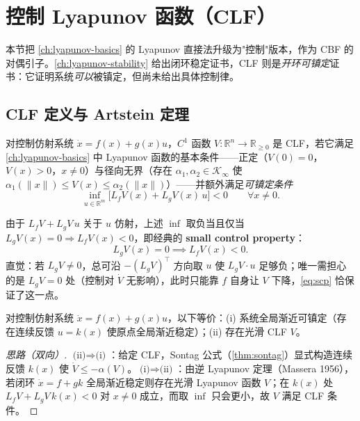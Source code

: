 \section{控制 Lyapunov 函数（CLF）}
\label{sec:cbf-clf}

本节把 \cref{ch:lyapunov-basics} 的 Lyapunov 直接法升级为"控制"版本，作为 CBF 的对偶引子。\cref{ch:lyapunov-stability} 给出闭环稳定证书，CLF 则是\emph{开环可镇定}证书：它证明系统\emph{可以}被镇定，但尚未给出具体控制律。

\subsection{CLF 定义与 Artstein 定理}

\begin{definition}[控制 Lyapunov 函数]\label{def:clf}
对控制仿射系统 $\dot x=f(x)+g(x)u$，$C^1$ 函数 $V:\mathbb R^n\to\mathbb R_{\ge0}$ 是 CLF，若它满足 \cref{ch:lyapunov-basics} 中 Lyapunov 函数的基本条件——正定（$V(0)=0$，$V(x)>0$，$x\neq0$）与径向无界（存在 $\alpha_1,\alpha_2\in\mathcal K_\infty$ 使 $\alpha_1(\|x\|)\le V(x)\le\alpha_2(\|x\|)$）——并额外满足\emph{可镇定条件}
\begin{equation}
\inf_{u\in\mathbb R^m}\big[L_fV(x)+L_gV(x)\,u\big]<0\qquad\forall x\neq0.
\label{eq:clf-cond}
\end{equation}
\end{definition}

由于 $L_fV+L_gV\,u$ 关于 $u$ 仿射，上述 $\inf$ 取负当且仅当 $L_gV(x)=0\Rightarrow L_fV(x)<0$，即经典的 \textbf{small control property}：
\begin{equation}
L_gV(x)=0\implies L_fV(x)<0.
\label{eq:scp}
\end{equation}
直觉：若 $L_gV\neq0$，总可沿 $-(L_gV)^\top$ 方向取 $u$ 使 $L_gV\cdot u$ 足够负；唯一需担心的是 $L_gV=0$ 处（控制对 $\dot V$ 无影响），此时只能靠 $f$ 自身让 $V$ 下降，\cref{eq:scp} 恰保证了这一点。

\begin{theorem}\label{thm:artstein}
对控制仿射系统 $\dot x=f(x)+g(x)u$，以下等价：(i) 系统全局渐近可镇定（存在连续反馈 $u=k(x)$ 使原点全局渐近稳定）；(ii) 存在光滑 CLF $V$。
\end{theorem}

\begin{proof}[思路（双向）]
$\text{(ii)}\Rightarrow\text{(i)}$：给定 CLF，Sontag 公式（\cref{thm:sontag}）显式构造连续反馈 $k(x)$ 使 $\dot V\le-\alpha(V)$。$\text{(i)}\Rightarrow\text{(ii)}$：由逆 Lyapunov 定理（Massera 1956），若闭环 $\dot x=f+gk$ 全局渐近稳定则存在光滑 Lyapunov 函数 $V$；在 $k(x)$ 处 $L_fV+L_gV\,k(x)<0$ 对 $x\neq0$ 成立，而取 $\inf$ 只会更小，故 $V$ 满足 CLF 条件。
\end{proof}

